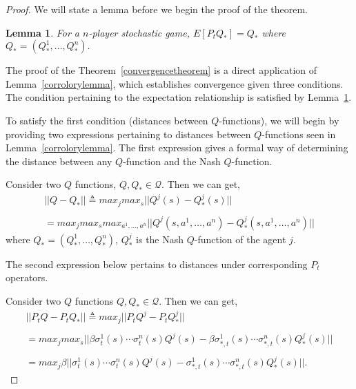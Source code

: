 \documentclass[jair, twoside,11pt,theapa]{article}
\newtheorem{lemm}{Lemma}
\begin{document}
\begin{proof}

We will state a lemma before we begin the proof of the theorem. 


\begin{lemm}\label{lemm:expectation}
For a $n$-player stochastic game, $E[P_t Q_{*}] = Q_{*}$ where $Q_* = (Q^1_{*}, \ldots, Q^n_{*}).$
\end{lemm}





The proof of the Theorem~\ref{convergencetheorem} is a direct application of Lemma~\ref{corrolorylemma}, which establishes convergence given three conditions. The condition pertaining to the expectation relationship is satisfied by Lemma~\ref{lemm:expectation}.

To satisfy the first condition (distances between $Q$-functions), we will begin by providing two expressions pertaining to distances between $Q$-functions seen in Lemma~\ref{corrolorylemma}.  The first expression gives a formal way of determining the distance between any $Q$-function and the Nash $Q$-function. 

Consider two $Q$ functions, $Q, Q_{*} \in \mathcal{Q}$. Then we can get,
    \begin{equation}\label{eq:Qtapplication}
    \begin{array}{l}
        ||Q - Q_{*}|| \triangleq  max_j max_s ||Q^j(s) - Q_{*}^j(s) || 
        \\ \\
         = max_j max_s max_{a^1, \ldots, a^n} ||Q^j(s, a^1, \ldots, a^n) -  Q_{*}^j(s, a^1, \ldots, a^n) ||
    \end{array}
    \end{equation}
    where $Q_{*} = (Q^1_*, \ldots, Q^n_*)$, $Q^j_*$ is the Nash $Q$-function of the agent $j$. 


The second expression below pertains to distances under corresponding $P_t$ operators. 


\noindent Consider two $Q$ functions $Q, Q_{*} \in \mathcal{Q}$. Then we can get, 
\begin{equation}\label{eq:Ptapplication}
    \begin{array}{l}
     ||P_t Q  - P_t Q_{*}|| \triangleq max_j || P_t Q^j - P_t Q_{*}^j||
     \\ \\ 
     = max_j max_s|| \beta \sigma^1_t(s) \cdots \sigma^n_t(s) Q^j(s)  - \beta \sigma_{*,t}^1(s) \cdots {\sigma}_{*,t}^n(s) Q_{*}^j(s)||
     \\ \\
     = max_j \beta|| \sigma^1_t(s) \cdots \sigma^n_t(s) Q^j(s)  - \sigma_{*,t}^1(s) \cdots \sigma_{*,t}^n(s) Q_{*}^j(s)||.
    \end{array}
\end{equation}


\end{proof}
\end{document}
